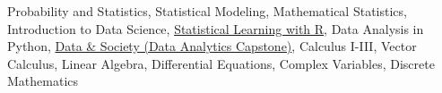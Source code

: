 Probability and Statistics, 
Statistical Modeling, 
Mathematical Statistics, 
Introduction to Data Science, 
\href{https://github.com/jonmgeiger/islr-notes}{Statistical Learning with R}, 
Data Analysis in Python, 
\href{https://github.com/noelgoodwin/household-conditions}{Data \& Society (Data Analytics Capstone)}, 
Calculus I-III, 
Vector Calculus, 
Linear Algebra, 
Differential Equations, 
Complex Variables, 
Discrete Mathematics